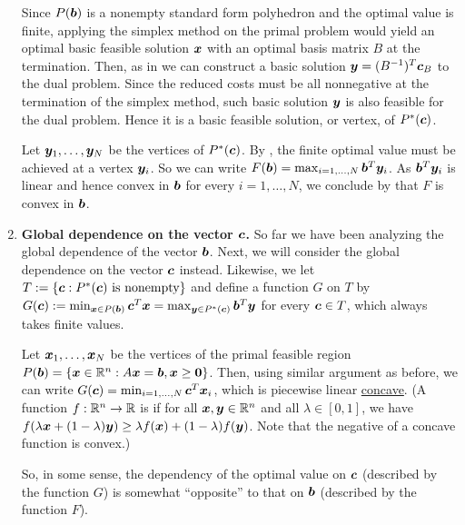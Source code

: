 \begin{enumerate}
\begin{pf}
\begin{pf}
Since \(P(\bm{b})\) is a nonempty standard form polyhedron and the optimal
value is finite, applying the simplex method on the primal problem would yield
an optimal basic feasible solution \(\bm{x}\) with an optimal basis matrix
\(B\) at the termination. Then, as in 
we can construct a basic solution \(\bm{y}=(B^{-1})^{T}\bm{c}_{B}\) to the
dual problem. Since the reduced costs must be all nonnegative at the
termination of the simplex method, such basic solution \(\bm{y}\) is also
feasible for the dual problem. Hence it is a basic feasible solution, or
vertex, of \(P^{*}(\bm{c})\).
\end{pf}

Let \(\bm{y}_{1},\dotsc,\bm{y}_{N}\) be the vertices of \(P^*(\bm{c})\).
By , the finite optimal value must be achieved at a
vertex \(\bm{y}_{i}\). So we can write
\(F(\bm{b})=\max_{i=1,\dotsc,N}\bm{b}^{T}\bm{y}_i\). As
\(\bm{b}^{T}\bm{y}_i\) is linear and hence convex in \(\bm{b}\) for every
\(i=1,\dotsc,N\), we conclude by  that \(F\) is convex in
\(\bm{b}\).
\end{pf}
\item\label{it:global-dep-c-g-piecewise-lin-concave} \textbf{Global dependence
on the vector \(\bm{c}\).} So far we have been analyzing the global
dependence of the vector \(\bm{b}\). Next, we will consider the global
dependence on the vector \(\bm{c}\) instead. Likewise, we let
\(T:=\{\bm{c}:P^*(\bm{c})\text{ is nonempty}\}\) and define a function
\(G\) on \(T\) by \(G(\bm{c}):=\min_{\bm{x}\in
P(\bm{b})}\bm{c}^{T}\bm{x} =\max_{\bm{y}\in
P^*(\bm{c})}\bm{b}^{T}\bm{y}\) for every \(\bm{c}\in T\), which always
takes finite values.

Let \(\bm{x}_1,\dotsc,\bm{x}_N\) be the vertices of the primal feasible
region
\(P(\bm{b})=\{\bm{x}\in\mathbb{R}^n:A\bm{x}=\bm{b},\bm{x}\ge\bm{0}\}\).
Then, using similar argument as before, we can write
\(G(\bm{c})=\min_{i=1,\dotsc,N}\bm{c}^{T}\bm{x}_i\), which is piecewise
linear \underline{concave}. (A function \(f:\mathbb{R}^n\to\mathbb{R}\) is  if
for all \(\bm{x},\bm{y}\in\mathbb{R}^n\) and all \(\lambda\in[0,1]\), we have
\(f(\lambda\bm{x}+(1-\lambda)\bm{y})\ge\lambda
f(\bm{x})+(1-\lambda)f(\bm{y})\). Note that the negative of a concave
function is convex.)

So, in some sense, the dependency of the optimal value on \(\bm{c}\)
(described by the function \(G\)) is somewhat ``opposite'' to that on
\(\bm{b}\) (described by the function \(F\)).
\end{enumerate}

